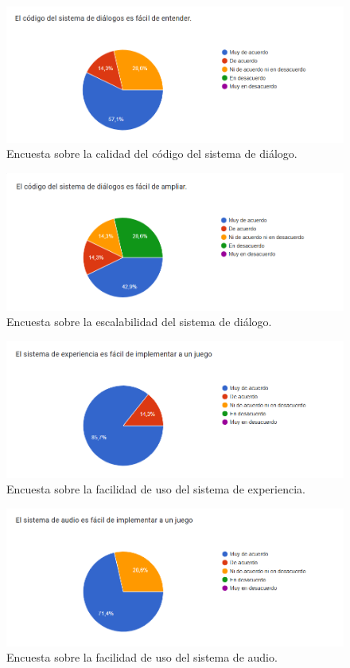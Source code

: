 \begin{figure}[H]
  \centering
  \includegraphics[width=450px,clip=true]{CUESTIONARIO_2.png}
  \caption{Encuesta sobre la calidad del código del sistema de diálogo.}
  \label{fig:CUESTIONARIO_2}
\end{figure}
\raggedbottom

\begin{figure}[H]
  \centering
  \includegraphics[width=450px,clip=true]{CUESTIONARIO_3.png}
  \caption{Encuesta sobre la escalabilidad del sistema de diálogo.}
  \label{fig:CUESTIONARIO_3}
\end{figure}
\raggedbottom

\begin{figure}[H]
  \centering
  \includegraphics[width=450px,clip=true]{CUESTIONARIO_4.png}
  \caption{Encuesta sobre la facilidad de uso del sistema de experiencia.}
  \label{fig:CUESTIONARIO_4}
\end{figure}
\raggedbottom

\begin{figure}[H]
  \centering
  \includegraphics[width=450px,clip=true]{CUESTIONARIO_5.png}
  \caption{Encuesta sobre la facilidad de uso del sistema de audio.}
  \label{fig:CUESTIONARIO_5}
\end{figure}
\raggedbottom

